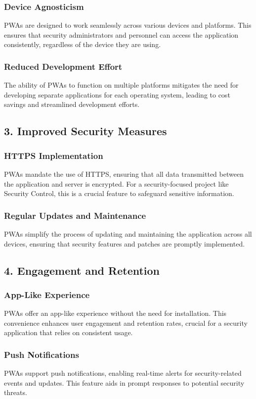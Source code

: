 \documentclass[journal]{IEEEtran}
\begin{document}
	\subsubsection*{Device Agnosticism}
	PWAs are designed to work seamlessly across various devices and platforms. This ensures that security administrators and personnel can access the application consistently, regardless of the device they are using.
	\subsubsection*{Reduced Development Effort}
	The ability of PWAs to function on multiple platforms mitigates the need for developing separate applications for each operating system, leading to cost savings and streamlined development efforts.
	
	\subsection*{3. Improved Security Measures}
	\subsubsection*{HTTPS Implementation}
	PWAs mandate the use of HTTPS, ensuring that all data transmitted between the application and server is encrypted. For a security-focused project like Security Control, this is a crucial feature to safeguard sensitive information.
	\subsubsection*{Regular Updates and Maintenance}
	PWAs simplify the process of updating and maintaining the application across all devices, ensuring that security features and patches are promptly implemented.
	
	\subsection*{4. Engagement and Retention}
	\subsubsection*{App-Like Experience}
	PWAs offer an app-like experience without the need for installation. This convenience enhances user engagement and retention rates, crucial for a security application that relies on consistent usage.
	\subsubsection*{Push Notifications}
	PWAs support push notifications, enabling real-time alerts for security-related events and updates. This feature aids in prompt responses to potential security threats.
	
\end{document}
